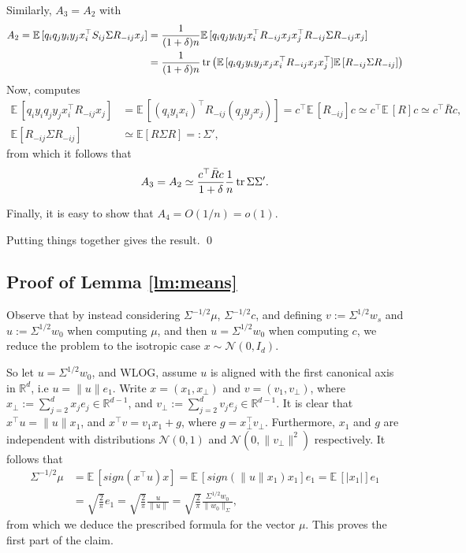 Similarly, $A_3=A_2$ with
\begin{align*}
A_2 = \mathbb E\,[q_iq_jy_iy_jx_i^\top S_{ij}\Sigma R_{-ij}x_j] &= \frac{1}{(1+\delta)n}\mathbb E\,[q_iq_jy_iy_jx_i^\top R_{-ij}x_jx_j^\top R_{-ij}\Sigma R_{-ij}x_j]\\
&= \frac{1}{(1+\delta)n}\operatorname{tr}\left(\mathbb E\,[q_iq_jy_iy_jx_jx_i^\top R_{-ij} x_j x_j^\top]\mathbb E\,[R_{-ij}\Sigma R_{-ij}]\right)
\end{align*}
Now, computes 
\begin{align*}
\mathbb E\,[q_iy_iq_jy_jx_i^\top R_{-ij}x_j] &= \mathbb E\,[(q_iy_ix_i)^\top R_{-ij}(q_jy_jx_j)]= c^\top\mathbb E\,[R_{-ij}] c \simeq c^\top\mathbb E\,[R] c \simeq c^\top\bar R c,\\
\mathbb E[R_{-ij}\Sigma R_{-ij}] &\simeq \mathbb E[R\Sigma R] =: \Sigma',
\end{align*}
 from which it follows that
\begin{eqnarray}
A_3 = A_2 \simeq \frac{c^\top \bar R c}{1+\delta}\frac{1}{n}\operatorname{tr} \Sigma \Sigma'.
\end{eqnarray}

Finally, it is easy to show that $A_4=O(1/n)=o(1)$.

Putting things together gives the result. \qed

\subsection{Proof of Lemma \ref{lm:means}}

Observe that by instead considering $\Sigma^{-1/2}\mu$, $\Sigma^{-1/2}c$, and defining $v:=\Sigma^{1/2}w_s$ and  $u:=\Sigma^{1/2}w_0$ when computing $\mu$, and then  $u=\Sigma^{1/2}w_0$ when computing $c$, we reduce the problem to the isotropic case $x \sim \mathcal N(0,I_d)$.

So let $u=\Sigma^{1/2}w_0$, and WLOG, assume $u$ is aligned with the first canonical axis in $\mathbb R^d$, i.e $u=\|u\| e_1$. Write $x=(x_1,x_\perp)$ and $v = (v_1,v_\perp)$, where $x_\perp := \sum_{j=2}^d x_j e_j  \in \mathbb R^{d-1}$, and $v_\perp := \sum_{j=2}^d v_j e_j  \in \mathbb R^{d-1}$. It is clear that $x^\top u = \|u\|x_1$, and $x^\top v = v_1 x_1 + g$, where  $g=x_\perp^\top v_\perp$. Furthermore, $x_1$ and $g$ are independent with distributions $\mathcal N(0,1)$ and $\mathcal N(0,\|v_\perp\|^2)$ respectively. It follows that
    \begin{align*}
        \Sigma^{-1/2}\mu &= \mathbb E\,[sign(x^\top u)x] = \mathbb E\,[sign(\|u\|x_1)x_1]e_1 = \mathbb E\,[|x_1|]e_1\\
        &= \sqrt{\frac{2}{\pi}}e_1 = \sqrt{\frac{2}{\pi}}\frac{u}{\|u\|} = \sqrt{\frac{2}{\pi}}\frac{\Sigma^{1/2}w_0}{\|w_0\|_\Sigma},
    \end{align*}
    from which we deduce the prescribed formula for the vector $\mu$. This proves the first part of the claim.


